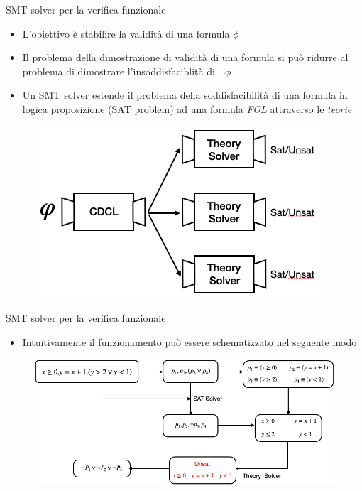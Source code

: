 \documentclass[]{beamer}
\begin{document}
\begin{frame}{SMT solver per la verifica funzionale}
\begin{itemize}
    \item L'obiettivo è stabilire la validità di una formula \textit{$\phi$}
    \item Il problema della dimostrazione di validità di una formula si può ridurre al problema di dimostrare l'insoddisfaciblità  di $\neg$\textit{$\phi$}
    \item Un SMT solver estende il problema della soddisfacibilità di una formula in logica proposizione (SAT problem) ad una formula \textit{FOL} attraverso le \textit{teorie}
\end{itemize}
\begin{figure}
    \centering
    \includegraphics[scale=0.5]{assets/img/theory_solver.png}
\end{figure}
\end{frame}

\begin{frame}{SMT solver per la verifica funzionale}
\begin{itemize}
    \item Intuitivamente il funzionamento può essere schematizzato nel seguente modo
\end{itemize}
\begin{figure}
    \centering
    \includegraphics[scale=0.4]{assets/img/smt.png}
\end{figure}    
\end{frame}
\end{document}

